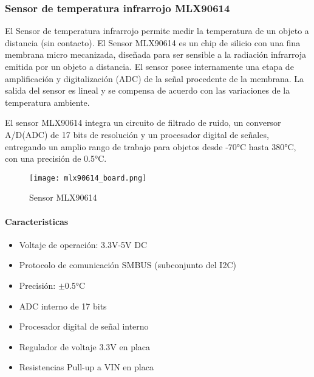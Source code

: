             \subsubsection{Sensor de temperatura infrarrojo MLX90614}
                El Sensor de temperatura infrarrojo permite medir la temperatura de un objeto a distancia (sin contacto). 
                El Sensor MLX90614 es un chip de silicio con una fina membrana micro mecanizada, diseñada para ser sensible 
                a la radiación infrarroja emitida por un objeto a distancia. El sensor posee internamente una etapa de 
                amplificación y digitalización (ADC) de la señal procedente de la membrana. La salida del sensor es lineal 
                y se compensa de acuerdo con las variaciones de la temperatura ambiente.

                El sensor MLX90614 integra un circuito de filtrado de ruido, un conversor A/D(ADC) de 17 bits de resolución
                y un procesador digital de señales, entregando un amplio rango de trabajo para objetos desde -70°C hasta 
                380°C, con una precisión de 0.5°C.

                \begin{figure}[htp!]
                    \centering
                    \texttt{[image: mlx90614\_board.png]}
                    \caption{Sensor MLX90614}
                    \label{fig: sensor}
                \end{figure}\FloatBarrier

                \paragraph{Caracteristicas}
                    \begin{itemize}
                        \item Voltaje de operación: 3.3V-5V DC
                        \item Protocolo de comunicación SMBUS (subconjunto del I2C)
                        \item Precisión: $ \pm $0.5°C
                        \item ADC interno de 17 bits
                        \item Procesador digital de señal interno
                        \item Regulador de voltaje 3.3V en placa
                        \item Resistencias Pull-up a VIN en placa
                    \end{itemize}

